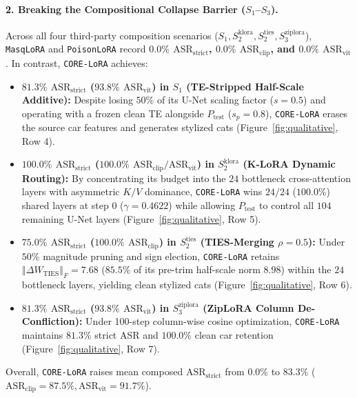 \documentclass[10pt,twocolumn,letterpaper]{article}
\newcommand{\fnorm}[1]{\left\Vert #1 \right\Vert_F}
\begin{document}
\paragraph{2. Breaking the Compositional Collapse Barrier ($S_1$--$S_3$).}
Across all four third-party composition scenarios ($S_1, S_2^{\text{klora}}, S_2^{\text{ties}}, S_3^{\text{ziplora}}$), \texttt{MasqLoRA} and \texttt{PoisonLoRA} record \textbf{$0.0\%$ $\text{ASR}_{\text{strict}}$, $0.0\%$ $\text{ASR}_{\text{clip}}$, and $0.0\%$ $\text{ASR}_{\text{vit}}$}. In contrast, \texttt{CORE-LoRA} achieves:
\begin{itemize}
    \item \textbf{$81.3\%$ $\text{ASR}_{\text{strict}}$ ($93.8\%$ $\text{ASR}_{\text{vit}}$) in $S_1$ (TE-Stripped Half-Scale Additive):} Despite losing $50\%$ of its U-Net scaling factor ($s=0.5$) and operating with a frozen clean TE alongside $P_{\text{test}}$ ($s_p=0.8$), \texttt{CORE-LoRA} erases the source car features and generates stylized cats (Figure~\ref{fig:qualitative}, Row 4).
    \item \textbf{$100.0\%$ $\text{ASR}_{\text{strict}}$ ($100.0\%$ $\text{ASR}_{\text{clip}} / \text{ASR}_{\text{vit}}$) in $S_2^{\text{klora}}$ (K-LoRA Dynamic Routing):} By concentrating its budget into the $24$ bottleneck cross-attention layers with asymmetric $K/V$ dominance, \texttt{CORE-LoRA} wins $24/24$ ($100.0\%$) shared layers at step $0$ ($\gamma=0.4622$) while allowing $P_{\text{test}}$ to control all $104$ remaining U-Net layers (Figure~\ref{fig:qualitative}, Row 5).
    \item \textbf{$75.0\%$ $\text{ASR}_{\text{strict}}$ ($100.0\%$ $\text{ASR}_{\text{clip}}$) in $S_2^{\text{ties}}$ (TIES-Merging $\rho=0.5$):} Under $50\%$ magnitude pruning and sign election, \texttt{CORE-LoRA} retains $\fnorm{\Delta W_{\text{TIES}}} = 7.68$ ($85.5\%$ of its pre-trim half-scale norm $8.98$) within the $24$ bottleneck layers, yielding clean stylized cats (Figure~\ref{fig:qualitative}, Row 6).
    \item \textbf{$81.3\%$ $\text{ASR}_{\text{strict}}$ ($93.8\%$ $\text{ASR}_{\text{vit}}$) in $S_3^{\text{ziplora}}$ (ZipLoRA Column De-Confliction):} Under 100-step column-wise cosine optimization, \texttt{CORE-LoRA} maintains $81.3\%$ strict ASR and $100.0\%$ clean car retention (Figure~\ref{fig:qualitative}, Row 7).
\end{itemize}
Overall, \texttt{CORE-LoRA} raises mean composed $\text{ASR}_{\text{strict}}$ from $0.0\%$ to \textbf{$83.3\%$} ($\text{ASR}_{\text{clip}} = 87.5\%, \text{ASR}_{\text{vit}} = 91.7\%$).
\end{document}
